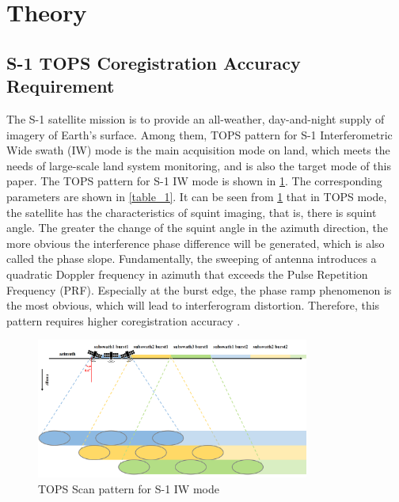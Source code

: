 \documentclass[preprint, authoryear]{elsarticle}
\begin{document}
\section{Theory}
\label{sec:2}

\subsection{S-1 TOPS Coregistration Accuracy Requirement}
The S-1 satellite mission is to provide an all-weather, day-and-night supply of imagery of Earth’s surface. Among them, TOPS pattern for S-1 Interferometric Wide swath (IW) mode is the main acquisition mode on land, which meets the needs of large-scale land system monitoring, and is also the target mode of this paper. The TOPS pattern for S-1 IW mode is shown in \ref{fig_1}. The corresponding parameters are shown in \ref{table_1}. It can be seen from \ref{fig_1} that in TOPS mode, the satellite has the characteristics of squint imaging, that is, there is squint angle. The greater the change of the squint angle in the azimuth direction, the more obvious the interference phase difference will be generated, which is also called the phase slope. Fundamentally, the sweeping of antenna introduces a quadratic Doppler frequency in azimuth that exceeds the Pulse Repetition Frequency (PRF). Especially at the burst edge, the phase ramp phenomenon is the most obvious, which will lead to interferogram distortion. Therefore, this pattern requires higher coregistration accuracy \cite{Interferometry_with_TOPS:_coregistration_and_azimuth_shifts}. \par

\begin{figure}
	\centering
	\includegraphics[width=0.8\textwidth]{figure/TOPS Scan pattern for S-1 IW mode.png}
	\caption{TOPS Scan pattern for S-1 IW mode}
	\label{fig_1}%
\end{figure}
\end{document}

